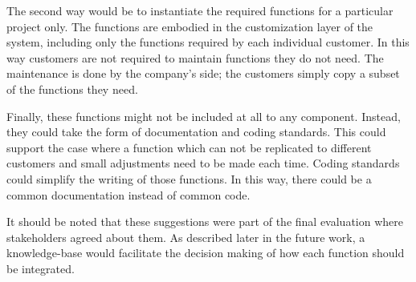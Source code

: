 The second way would be to instantiate the required functions for a particular project only. The functions are embodied in the customization layer of the system, including only the functions required by each individual customer. In this way customers are not required to maintain functions they do not need. The maintenance is done by the company's side; the customers simply copy a subset of the functions they need.

Finally, these functions might not be included at all to any component. Instead, they could take the form of documentation and coding standards. This could support the case where a function which can not be replicated to different customers and small adjustments need to be made each time. Coding standards could simplify the writing of those functions. In this way, there could be a common documentation instead of common code.

It should be noted that these suggestions were part of the final evaluation where stakeholders agreed about them. As described later in the future work, a knowledge-base would facilitate the decision making of how each function should be integrated. 




